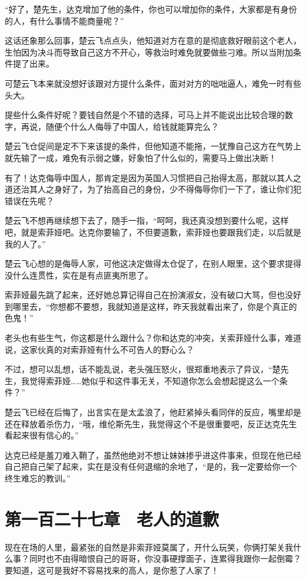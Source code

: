 “好了，楚先生，达克增加了他的条件，你也可以增加你的条件，大家都是有身份的人，有什么事情不能商量呢？”

这话还象那么回事，楚云飞点点头，他知道对方在意的是彻底救好眼前这个老人，生怕因为决斗而导致自己这方不开心，等救治时难免就要做些刁难。所以当附加条件提了出来。

可楚云飞本来就没想好该跟对方提什么条件，面对对方的咄咄逼人，难免一时有些头大。

提些什么条件好呢？要钱自然是个不错的选择，可马上并不能说出比较合理的数字，再说，随便个什么人侮辱了中国人，给钱就能算完么？

楚云飞仓促间是定不下来该提的条件，但他知道不能拖，一犹豫自己这方在气势上就先输了一成，难免有示弱之嫌，好象怕了什么似的，需要马上做出决断！

有了！达克侮辱中国人，那肯定是因为英国人习惯把自己抬得太高，那就以其人之道还治其人之身好了，为了抬高自己的身份，少不得侮辱你们一下了，谁让你们犯错误在先呢？

楚云飞不想再继续想下去了，随手一指，“呵呵，我还真没想到要什么呢，这样吧，就是索菲娅吧。达克你要输了，不但要道歉，索菲娅也要跟我们走，以后就是我的人了。”

楚云飞心想的是侮辱人家，可他这决定做得太仓促了，在别人眼里，这个要求提得没什么连贯性，实在是有点匪夷所思了。

索菲娅最先跳了起来，还好她总算记得自己在扮演淑女，没有破口大骂，但也没好到哪里去，“你想都不要想，我就知道是这样，昨天我就看出来了，你是个真正的色鬼！”

老头也有些生气，你这都是什么跟什么？你和达克的冲突，关索菲娅什么事，难道说，这家伙真的对索菲娅有什么不可告人的野心么？

不过，想可以乱想，话不能乱说，老头强压怒火，很郑重地表示了异议，“楚先生，我觉得索菲娅……她似乎和这件事无关，不知道你怎么会想起提这么一个条件？”

楚云飞已经在后悔了，出言实在是太孟浪了，他赶紧掉头看同伴的反应，嘴里却是还在释放着杀伤力，“哦，维伦斯先生，我觉得这个不是很重要吧，反正达克先生看起来很有信心的。”

达克已经是羞刀难入鞘了，虽然他绝对不想让妹妹掺乎进这件事来，但现在他已经自己把自己架了起来，实在是没有任何退缩的余地了，“是的，我一定要给你一个终生难忘的教训。”

\section{第一百二十七章　老人的道歉}

现在在场的人里，最紧张的自然是非索菲娅莫属了，开什么玩笑，你俩打架关我什么事？同时也不由得暗恨自己的哥哥，你没事硬撑面子，连累得我跟你一起倒霉？要知道，这可是我好不容易找来的高人，是你惹了人家了！

